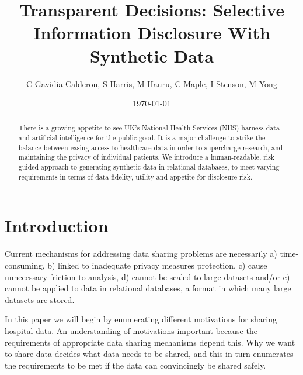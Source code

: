 \documentclass[11pt]{article}
\begin{document}
\title{Transparent Decisions: Selective Information Disclosure With Synthetic Data}
\author{C Gavidia-Calderon, S Harris, M Hauru, C Maple, I Stenson, M Yong}
\date{\today} %
\maketitle
\begin{abstract}
There is a growing appetite to see UK's National Health Services (NHS) harness data and artificial intelligence for the public good. It is a major challenge to strike the balance between easing access to healthcare data in order to supercharge research, and maintaining the privacy of individual patients. We introduce a human-readable, risk guided approach to generating synthetic data in relational databases, to meet varying requirements in terms of data fidelity, utility and appetite for disclosure risk.
\end{abstract}

\section{Introduction}

Current mechanisms for addressing data sharing problems are necessarily a) time-consuming, b) linked to inadequate privacy measures protection, c) cause unnecessary friction to analysis, d) cannot be scaled to large datasets and/or e) cannot be applied to data in relational databases, a format in which many large datasets are stored.


In this paper we will begin by enumerating different motivations for sharing hospital data. An understanding of motivations important because the requirements of appropriate data sharing mechanisms depend this. Why we want to share data decides what data needs to be shared, and this in turn enumerates the requirements to be met if the data can convincingly be shared safely. 
\end{document}
